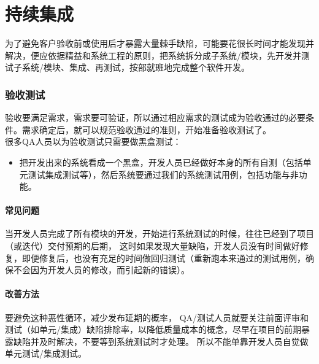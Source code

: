 \chapter{持续集成} %


为了避免客户验收前或使用后才暴露大量棘手缺陷，可能要花很长时间才能发现并解决，便应依据精益和系统工程的原则，把系统拆分成子系统/模块，先开发并测试子系统/模块、集成、再测试，按部就班地完成整个软件开发。

\hypertarget{ux9a8cux6536ux6d4bux8bd5}{%
\subsection{验收测试}\label{ux9a8cux6536ux6d4bux8bd5}}

验收要满足需求，需求要可验证，所以通过相应需求的测试成为验收通过的必要条件。需求确定后，就可以规范验收通过的准则，开始准备验收测试了。\\
很多QA人员以为验收测试只需要做黑盒测试：

\begin{itemize}
\tightlist
\item
  把开发出来的系统看成一个黑盒，开发人员已经做好本身的所有自测（包括单元测试集成测试等），然后系统要通过我们的系统测试用例，包括功能与非功能。
\end{itemize}

\hypertarget{ux5e38ux89c1ux95eeux9898}{%
\subsubsection{常见问题}\label{ux5e38ux89c1ux95eeux9898}}

当开发人员完成了所有模块的开发，开始进行系统测试的时候，往往已经到了项目（或迭代）交付预期的后期，
这时如果发现大量缺陷，开发人员没有时间做好修复，即便修复后，也没有充足的时间做回归测试（重新跑本来通过的测试用例，确保不会因为开发人员的修改，而引起新的错误）。

\hypertarget{ux6539ux5584ux65b9ux6cd5}{%
\subsubsection{改善方法}\label{ux6539ux5584ux65b9ux6cd5}}

要避免这种恶性循环，减少发布延期的概率，
QA/测试人员就要关注前面评审和测试（如单元/集成）缺陷排除率，以降低质量成本的概念，尽早在项目的前期暴露缺陷并及时解决，不要等到系统测试时才处理。
所以不能单靠开发人员自觉做单元测试/集成测试。


